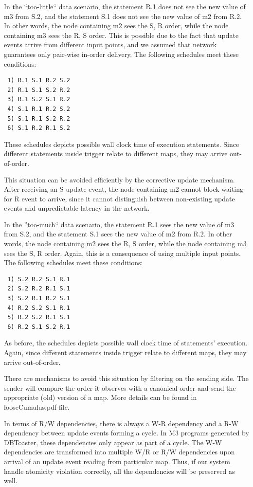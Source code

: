 \documentclass{sig-semester}
\begin{document}
In the ``too-little`` data scenario, the statement R.1 does not see the new value of m3 from S.2, and the statement S.1 does not see the new value of m2 from R.2. In other words, the node containing m2 sees the S, R order, while the node containing m3 sees the R, S order. This is possible due to the fact that update events arrive from different input points, and we assumed that network guarantees only pair-wise in-order delivery. The following schedules meet these conditions:
\begin{verbatim}
 1) R.1 S.1 R.2 S.2
 2) R.1 S.1 S.2 R.2
 3) R.1 S.2 S.1 R.2
 4) S.1 R.1 R.2 S.2
 5) S.1 R.1 S.2 R.2
 6) S.1 R.2 R.1 S.2
\end{verbatim}
These schedules depicts possible wall clock time of execution statements. Since different statements inside trigger relate to different maps, they may arrive out-of-order.

This situation can be avoided efficiently by the corrective update mechanism. After receiving an S update event, the node containing m2 cannot block waiting for R event to arrive, since it cannot distinguish between non-existing update events and unpredictable latency in the network.

In the ''too-much`` data scenario, the statement R.1 sees the new value of m3 from S.2, and the statement S.1 sees the new value of m2 from R.2. In other words, the node containing m2 sees the R, S order, while the node containing m3 sees the S, R order. Again, this is a consequence of using multiple input points. The following schedules meet these conditions:
\begin{verbatim}
 1) S.2 R.2 S.1 R.1
 2) S.2 R.2 R.1 S.1
 3) S.2 R.1 R.2 S.1
 4) R.2 S.2 S.1 R.1
 5) R.2 S.2 R.1 S.1
 6) R.2 S.1 S.2 R.1
\end{verbatim}
As before, the schedules depicts possible wall clock time of statements' execution. Again, since different statements inside trigger relate to different maps, they may arrive out-of-order.

There are mechanisms to avoid this situation by filtering on the sending side. The sender will compare the order it observes with a canonical order and send the appropriate (old) version of a map. More details can be found in looseCumulus.pdf file.

In terms of R/W dependencies, there is always a W-R dependency and a R-W dependency between update events forming a cycle. In M3 programs generated by DBToaster, these dependencies only appear as part of a cycle. The W-W dependencies are transformed into multiple W/R or R/W dependencies upon arrival of an update event reading from particular map. Thus, if our system handle atomicity violation correctly, all the dependencies will be preserved as well.
\end{document}
